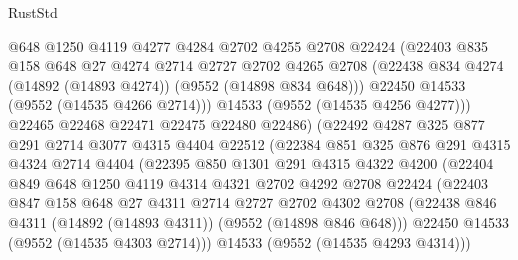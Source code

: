 \begin{lexlean}{RustStd}
\begin{coremodule}
                    @648
                    @1250
                    @4119
                    @4277
                    @4284
                    @2702
                    @4255
                    @2708
                    @22424
                    (@22403
                      @835
                      @158
                      @648
                      @27
                      @4274
                      @2714
                      @2727
                      @2702
                      @4265
                      @2708
                      (@22438 @834 @4274 (@14892 (@14893 @4274)) (@9552 (@14898 @834 @648)))
                      @22450
                      @14533
                      (@9552 (@14535 @4266 @2714)))
                    @14533
                    (@9552 (@14535 @4256 @4277)))
                  @22465
                  @22468
                  @22471
                  @22475
                  @22480
                  @22486)
                (@22492
                  @4287
                  @325
                  @877
                  @291
                  @2714
                  @3077
                  @4315
                  @4404
                  @22512
                  (@22384
                    @851
                    @325
                    @876
                    @291
                    @4315
                    @4324
                    @2714
                    @4404
                    (@22395
                      @850
                      @1301
                      @291
                      @4315
                      @4322
                      @4200
                      (@22404
                        @849
                        @648
                        @1250
                        @4119
                        @4314
                        @4321
                        @2702
                        @4292
                        @2708
                        @22424
                        (@22403
                          @847
                          @158
                          @648
                          @27
                          @4311
                          @2714
                          @2727
                          @2702
                          @4302
                          @2708
                          (@22438 @846 @4311 (@14892 (@14893 @4311)) (@9552 (@14898 @846 @648)))
                          @22450
                          @14533
                          (@9552 (@14535 @4303 @2714)))
                        @14533
                        (@9552 (@14535 @4293 @4314)))

\end{coremodule}
\end{lexlean}
